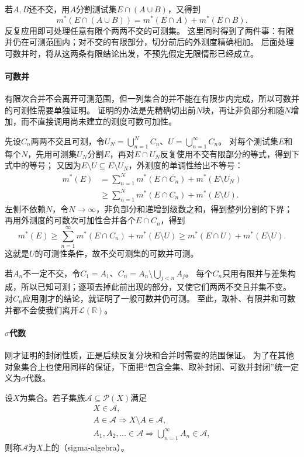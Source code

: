 若$A,B$还不交，用$A$分割测试集$E\cap(A\cup B)$，又得到
\[
 m^*(E\cap(A\cup B))=m^*(E\cap A)+m^*(E\cap B).
\]
反复应用即可处理任意有限个两两不交的可测集。
这里同时得到了两件事：有限并仍在可测范围内；对不交的有限部分，切分前后的外测度精确相加。
后面处理可数并时，将从这两条有限结论出发，不预先假定无限情形已经成立。

\paragraph{可数并}

有限次合并不会离开可测范围，但一列集合的并不能在有限步内完成，所以可数并的可测性需要单独证明。
证明的办法是先精确切出前$N$块，再让非负部分和随$N$增加，而不直接调用尚未建立的测度可数可加性。

先设$C_n$两两不交且可测，令$U_N=\bigcup_{n=1}^NC_n$、$U=\bigcup_{n=1}^{\infty}C_n$。
对每个测试集$E$和每个$N$，先用可测集$U_N$分割$E$，再对$E\cap U_N$反复使用不交有限部分的等式，得到下式中的等号；
又因为$E\setminus U\subseteq E\setminus U_N$，外测度的单调性给出不等号：
\[
 \begin{aligned}
 m^*(E)
 &=\sum_{n=1}^Nm^*(E\cap C_n)+m^*(E\setminus U_N)\\
 &\geq\sum_{n=1}^Nm^*(E\cap C_n)+m^*(E\setminus U).
 \end{aligned}
\]
左侧不依赖$N$，令$N\to\infty$，非负部分和递增到级数之和，得到整列分割的下界；再用外测度的可数次可加性合并各个$E\cap C_n$，得到
\[
 m^*(E)\geq\sum_{n=1}^{\infty}m^*(E\cap C_n)+m^*(E\setminus U)
 \geq m^*(E\cap U)+m^*(E\setminus U).
\]
这就是$U$的可测性条件，故不交可测集的可数并可测。

若$A_n$不一定不交，令$C_1=A_1$、$C_n=A_n\setminus\bigcup_{j<n}A_j$。
每个$C_n$只用有限并与差集构成，所以已知可测；逐项去掉此前出现的部分，又使它们两两不交且并集不变。
对$C_n$应用刚才的结论，就证明了一般可数并仍可测。
至此，取补、有限并和可数并都不会使我们离开$\mathcal L(\mathbb R)$。

\paragraph{$\sigma$代数}

刚才证明的封闭性质，正是后续反复分块和合并时需要的范围保证。
为了在其他对象集合上也使用同样的保证，下面把“包含全集、取补封闭、可数并封闭”统一定义为$\sigma$代数。
\begin{definition}[$\sigma$代数]
\label{def:analysis-sigma-algebra}
设$X$为集合。若子集族$\mathcal A\subseteq\mathcal P(X)$满足
\[
 \begin{gathered}
 X\in\mathcal A,\\
 A\in\mathcal A\Longrightarrow X\setminus A\in\mathcal A,\\
 A_1,A_2,\ldots\in\mathcal A
 \Longrightarrow\bigcup_{n=1}^{\infty}A_n\in\mathcal A,
 \end{gathered}
\]
则称$\mathcal A$为$X$上的（sigma-algebra）。
\end{definition}

